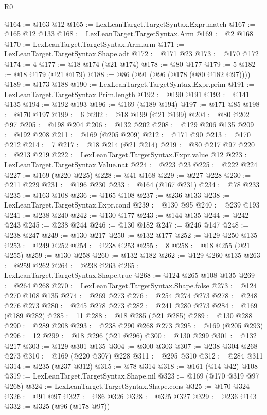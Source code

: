 \begin{lexlean}{R0}
\begin{coremodule}
{{{{{{{{{{{{{{{{{{{{{{{{{{{{{{{{{{{{{{{{{{{{{{{{{{{{{{{{{{{{{{{{{{{{{{{{{{{{{{{{{{{{{{{{{{{{{{{{{{{{{{{{{@164 := @163 @12
@165 := LexLeanTarget.TargetSyntax.Expr.match
@167 := @165 @12 @133
@168 := LexLeanTarget.TargetSyntax.Arm
@169 := @2 @168
@170 := LexLeanTarget.TargetSyntax.Arm.arm
@171 := LexLeanTarget.TargetSyntax.Shape.adt
@172 := @171 @23
@173 := @170 @172
@174 := 4
@177 := @18 @174 (@21 @174)
@178 := @80 @177
@179 := 5
@182 := @18 @179 (@21 @179)
@188 := @86 (@91 (@96 (@178 (@80 @182 @97))))
@189 := @173 @188
@190 := LexLeanTarget.TargetSyntax.Expr.prim
@191 := LexLeanTarget.TargetSyntax.Prim.length
@192 := @190 @191
@193 := @141 @135
@194 := @192 @193
@196 := @169 (@189 @194)
@197 := @171 @85
@198 := @170 @197
@199 := 6
@202 := @18 @199 (@21 @199)
@204 := @80 @202 @97
@205 := @198 @204
@206 := @132 @202
@208 := @129 @206 @135
@209 := @192 @208
@211 := @169 (@205 @209)
@212 := @171 @90
@213 := @170 @212
@214 := 7
@217 := @18 @214 (@21 @214)
@219 := @80 @217 @97
@220 := @213 @219
@222 := LexLeanTarget.TargetSyntax.Expr.value @12
@223 := LexLeanTarget.TargetSyntax.Value.nat
@224 := @223 @23
@225 := @222 @224
@227 := @169 (@220 @225)
@228 := @41 @168
@229 := @227 @228
@230 := @211 @229
@231 := @196 @230
@233 := @164 (@167 @231)
@234 := @78 @233
@235 := @163 @108
@236 := @165 @108
@237 := @236 @133
@238 := LexLeanTarget.TargetSyntax.Expr.cond
@239 := @130 @95
@240 := @239 @193
@241 := @238 @240
@242 := @130 @177
@243 := @144 @135
@244 := @242 @243
@245 := @238 @244
@246 := @130 @182
@247 := @246 @147
@248 := @238 @247
@249 := @130 @217
@250 := @132 @177
@252 := @129 @250 @135
@253 := @249 @252
@254 := @238 @253
@255 := 8
@258 := @18 @255 (@21 @255)
@259 := @130 @258
@260 := @132 @182
@262 := @129 @260 @135
@263 := @259 @262
@264 := @238 @263
@265 := LexLeanTarget.TargetSyntax.Shape.true
@268 := @124 @265 @108 @135
@269 := @264 @268
@270 := LexLeanTarget.TargetSyntax.Shape.false
@273 := @124 @270 @108 @135
@274 := @269 @273
@276 := @254 @274 @273
@278 := @248 @276 @273
@280 := @245 @278 @273
@282 := @241 @280 @273
@284 := @169 (@189 @282)
@285 := 11
@288 := @18 @285 (@21 @285)
@289 := @130 @288
@290 := @289 @208
@293 := @238 @290 @268 @273
@295 := @169 (@205 @293)
@296 := 12
@299 := @18 @296 (@21 @296)
@300 := @130 @299
@301 := @132 @217
@303 := @129 @301 @135
@304 := @300 @303
@307 := @238 @304 @268 @273
@310 := @169 (@220 @307) @228
@311 := @295 @310
@312 := @284 @311
@314 := @235 (@237 @312)
@315 := @78 @314
@318 := @161 (@14 @42) @108
@319 := LexLeanTarget.TargetSyntax.Shape.nil
@323 := @169 (@170 @319 @97 @268)
@324 := LexLeanTarget.TargetSyntax.Shape.cons
@325 := @170 @324
@326 := @91 @97
@327 := @86 @326
@328 := @325 @327
@329 := @236 @143
@332 := @325 (@96 (@178 @97))
}}}}}}}}}}}}}}}}}}}}}}}}}}}}}}}}}}}}}}}}}}}}}}}}}}}}}}}}}}}}}}}}}}}}}}}}}}}}}}}}}}}}}}}}}}}}}}}}}}}}}}}}}
\end{coremodule}
\end{lexlean}
